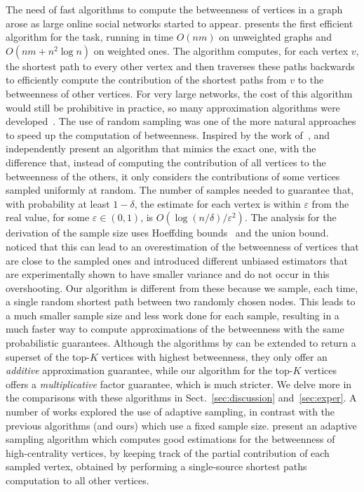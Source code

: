 The need of fast algorithms to compute the betweenness of vertices in a graph
arose as large online social networks started to appear. \citet{Brandes01} presents the
first efficient algorithm for the task, running in time $O(nm)$ on
unweighted graphs and $O(nm+n^2\log n)$ on weighted ones. The
algorithm computes, for each vertex $v$, the shortest path to every other vertex
and then traverses these paths backwards to efficiently compute the contribution
of the shortest paths from $v$ to the betweenness of other vertices. For very
large networks, the cost of this algorithm would still be prohibitive in
practice, so many approximation algorithms were
developed~\citep{JacobKLPT05,BrandesP07,BaderKMM07,GeisbergerSS08,MaiyaBW10,LimMRTB11}.
The use of random sampling was one of the more natural approaches to speed up
the computation of betweenness. Inspired by the work of~\citet{EppsteinW04},
\citet{JacobKLPT05} and independently \citet{BrandesP07} present an algorithm
that mimics the exact one, with the difference that,
instead of computing the contribution of all vertices to the betweenness of the
others, it only considers the contributions of some vertices sampled uniformly
at random. The number of samples needed to guarantee that, with probability at
least $1-\delta$, the estimate for each vertex is within $\varepsilon$ from the
real value, for some $\varepsilon\in(0,1)$, is
$O(\log(n/\delta)/\varepsilon^2)$. The analysis for the derivation of the sample
size uses Hoeffding bounds~\citep{Hoeffding63} and the union bound.
\citet{GeisbergerSS08} noticed that this can lead to an overestimation of the
betweenness of vertices that are close to the sampled ones and introduced
different unbiased estimators that are experimentally shown to have smaller
variance and do not occur in this overshooting. Our algorithm is different
from these because we sample, each time, a single random shortest path between
two randomly chosen nodes. This leads to a much smaller sample size and less
work done for each sample, resulting in a much faster way to compute
approximations of the betweenness with the same probabilistic guarantees.
Although the algorithms by \citep{BrandesP07,JacobKLPT05,GeisbergerSS08} can be
extended to return a superset of the top-$K$ vertices with highest betweenness,
they only offer an \emph{additive} approximation guarantee, while our algorithm
for the top-$K$ vertices offers a \emph{multiplicative} factor guarantee, which
is much stricter. We delve more in the comparisons with these algorithms in
Sect.~\ref{sec:discussion} and~\ref{sec:exper}. A number of works explored
the use of adaptive sampling, in contrast with the previous algorithms (and
ours) which use a fixed sample size. \citet{BaderKMM07} present an adaptive
sampling algorithm which computes good estimations for the betweenness of
high-centrality vertices, by keeping track of the partial contribution of each
sampled vertex, obtained by performing a single-source shortest paths
computation to all other vertices. 

